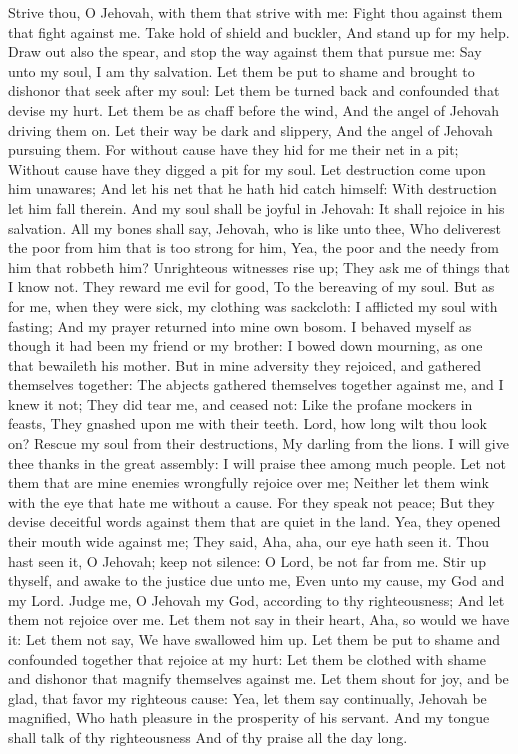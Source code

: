 Strive thou, O Jehovah, with them that strive with me: Fight thou against them that fight against me.  Take hold of shield and buckler, And stand up for my help.  Draw out also the spear, and stop the way against them that pursue me: Say unto my soul, I am thy salvation.  Let them be put to shame and brought to dishonor that seek after my soul: Let them be turned back and confounded that devise my hurt.  Let them be as chaff before the wind, And the angel of Jehovah driving them on.  Let their way be dark and slippery, And the angel of Jehovah pursuing them.  For without cause have they hid for me their net in a pit; Without cause have they digged a pit for my soul.  Let destruction come upon him unawares; And let his net that he hath hid catch himself: With destruction let him fall therein.  And my soul shall be joyful in Jehovah: It shall rejoice in his salvation.  All my bones shall say, Jehovah, who is like unto thee, Who deliverest the poor from him that is too strong for him, Yea, the poor and the needy from him that robbeth him?  Unrighteous witnesses rise up; They ask me of things that I know not.  They reward me evil for good, To the bereaving of my soul.  But as for me, when they were sick, my clothing was sackcloth: I afflicted my soul with fasting; And my prayer returned into mine own bosom.  I behaved myself as though it had been my friend or my brother: I bowed down mourning, as one that bewaileth his mother.  But in mine adversity they rejoiced, and gathered themselves together: The abjects gathered themselves together against me, and I knew it not; They did tear me, and ceased not:  Like the profane mockers in feasts, They gnashed upon me with their teeth.  Lord, how long wilt thou look on? Rescue my soul from their destructions, My darling from the lions.  I will give thee thanks in the great assembly: I will praise thee among much people.  Let not them that are mine enemies wrongfully rejoice over me; Neither let them wink with the eye that hate me without a cause.  For they speak not peace; But they devise deceitful words against them that are quiet in the land.  Yea, they opened their mouth wide against me; They said, Aha, aha, our eye hath seen it.  Thou hast seen it, O Jehovah; keep not silence: O Lord, be not far from me.  Stir up thyself, and awake to the justice due unto me, Even unto my cause, my God and my Lord.  Judge me, O Jehovah my God, according to thy righteousness; And let them not rejoice over me.  Let them not say in their heart, Aha, so would we have it: Let them not say, We have swallowed him up.  Let them be put to shame and confounded together that rejoice at my hurt: Let them be clothed with shame and dishonor that magnify themselves against me.  Let them shout for joy, and be glad, that favor my righteous cause: Yea, let them say continually, Jehovah be magnified, Who hath pleasure in the prosperity of his servant.  And my tongue shall talk of thy righteousness And of thy praise all the day long. 
